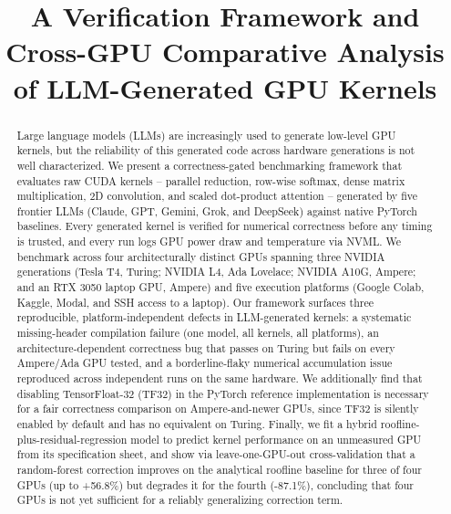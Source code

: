 \documentclass[conference]{IEEEtran}
\begin{document}
\title{A Verification Framework and Cross-GPU Comparative Analysis of LLM-Generated GPU Kernels}

\author{
}

\maketitle

\begin{abstract}
Large language models (LLMs) are increasingly used to generate low-level GPU kernels, but the
reliability of this generated code across hardware generations is not well characterized. We
present a correctness-gated benchmarking framework that evaluates raw CUDA kernels --
parallel reduction, row-wise softmax, dense matrix multiplication, 2D convolution, and
scaled dot-product attention -- generated by five frontier LLMs (Claude, GPT, Gemini, Grok, and
DeepSeek) against native PyTorch baselines. Every generated kernel is verified for numerical
correctness before any timing is trusted, and every run logs GPU power draw and temperature via
NVML. We benchmark across four architecturally distinct GPUs spanning three NVIDIA generations
(Tesla T4, Turing; NVIDIA L4, Ada Lovelace; NVIDIA A10G, Ampere; and an RTX 3050 laptop GPU,
Ampere) and five execution platforms (Google Colab, Kaggle, Modal, and SSH access to a laptop).
Our framework surfaces three reproducible, platform-independent defects in LLM-generated kernels:
a systematic missing-header compilation failure (one model, all kernels, all platforms), an
architecture-dependent correctness bug that passes on Turing but fails on every Ampere/Ada GPU
tested, and a borderline-flaky numerical accumulation issue reproduced across independent runs on
the same hardware. We additionally find that disabling TensorFloat-32 (TF32) in the PyTorch
reference implementation is necessary for a fair correctness comparison on Ampere-and-newer GPUs,
since TF32 is silently enabled by default and has no equivalent on Turing. Finally, we fit a
hybrid roofline-plus-residual-regression model to predict kernel performance on an unmeasured
GPU from its specification sheet, and show via leave-one-GPU-out cross-validation that a
random-forest correction improves on the analytical roofline baseline for three of four GPUs
(up to +56.8\%) but degrades it for the fourth (-87.1\%), concluding that four GPUs is not yet
sufficient for a reliably generalizing correction term.
\end{abstract}
\end{document}

